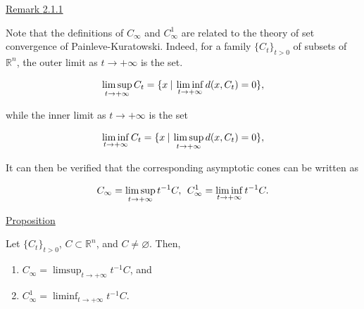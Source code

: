 \documentclass[a4paper,11pt]{jsarticle}
\newcommand{\PROPOSITION}[2]{\begin{itembox}[l]{\underline{Proposition {#1} }}{#2}\end{itembox}}
\newcommand{\REMARK}[2]{\begin{itembox}[l]{\underline{Remark {#1} }}{#2}\end{itembox}}
\newcommand{\NDemenstionalRealEuclidianSpace}{\mathbb{R}^n}
\begin{document}
\REMARK{2.1.1}{
  Note that the definitions of $C_{\infty}$ and $C_{\infty}^1$ are related to the theory of set convergence of Painleve-Kuratowski. Indeed, for a family $\{C_t\}_{t>0}$ of subsets of $\NDemenstionalRealEuclidianSpace$, the outer limit as $t \rightarrow + \infty$ is the set.

  \begin{equation}
    \limsup_{t \to +\infty} C_t = \{x \:|\: \liminf_{t \to +\infty} d(x, C_t) = 0\}, \notag
  \end{equation}

  while the inner limit as $t \rightarrow +\infty$ is the set

  \begin{equation}
    \liminf_{t \to +\infty} C_t = \{x \:|\: \limsup_{t \to +\infty} d(x, C_t) = 0\}, \notag
  \end{equation}

  It can then be verified that the corresponding asymptotic cones can be written as

  \begin{equation}
    C_{\infty} = \limsup_{t \to +\infty} t^{-1} C,\:\: C_{\infty}^1  = \liminf_{t \to +\infty} t^{-1} C. \notag
  \end{equation}
}

\PROPOSITION{}{
  Let $\{C_t\}_{t > 0}$, $C \subset \NDemenstionalRealEuclidianSpace$, and $C \ne \varnothing $. Then,

  \begin{enumerate}
    \item $C_{\infty} = \limsup_{t \to + \infty} t^{-1}C$, and
    \item $C_{\infty}^{1} = \liminf_{t \to + \infty} t^{-1}C$.
  \end{enumerate}
}
\end{document}
